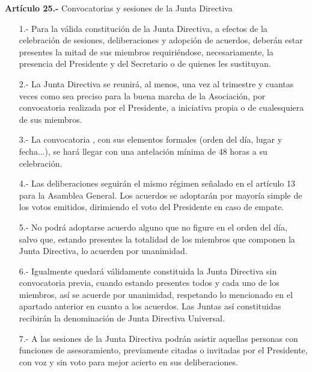 \documentclass[a4paper,12pt]{article}
\begin{document}
\begin{onehalfspace}
\bigskip\bigskip
\newpage
\textbf{Art\'iculo 25.-} Convocatorias y sesiones de la Junta Directiva
\begin{itemize}
\item [1.-] Para la v\'alida constituci\'on de la Junta Directiva, a efectos de la celebraci\'on de sesiones, deliberaciones y adopci\'on de acuerdos, deber\'an estar presentes la mitad de sus miembros requiri\'endose, necesariamente, la presencia del Presidente y del Secretario o de quienes les sustituyan.
\item [2.-] La Junta Directiva se reunir\'a, al menos, una vez al trimestre y cuantas veces como sea preciso para la buena marcha de la Asociaci\'on, por convocatoria realizada por el Presidente, a iniciativa propia o de cualesquiera de sus miembros.
\item [3.-] La convocatoria , con sus elementos formales (orden del d\'ia, lugar y fecha...), se har\'a llegar con una antelaci\'on m\'inima de 48 horas a su celebraci\'on.
\item [4.-] Las deliberaciones seguir\'an el mismo r\'egimen se\~nalado en el art\'iculo 13 para la Asamblea General. Los acuerdos se adoptar\'an por mayor\'ia simple de los votos emitidos, dirimiendo el voto del Presidente en caso de empate.
\item [5.-] No podr\'a adoptarse acuerdo alguno que no figure en el orden del d\'ia, salvo que, estando presentes la totalidad de los miembros que componen la Junta Directiva, lo acuerden por unanimidad.
\item [6.-] Igualmente quedar\'a v\'alidamente constituida la Junta Directiva sin convocatoria previa, cuando estando presentes todos y cada uno de los miembros, as\'i se acuerde por unanimidad, respetando lo mencionado en el apartado anterior en cuanto a los acuerdos. Las Juntas as\'i constituidas recibir\'an la denominaci\'on de Junta Directiva Universal.
\item [7.-] A las sesiones de la Junta Directiva podr\'an asistir aquellas personas con funciones de asesoramiento, previamente citadas o invitadas por el Presidente, con voz y sin voto para mejor acierto en sus deliberaciones.
\end{itemize}

\bigskip\bigskip


\end{onehalfspace}
\end{document}
